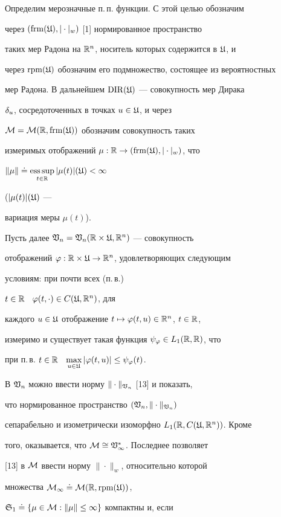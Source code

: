 Определим мерозначные п.\,п. функции. С этой целью обозначим


через $(\operatorname{frm}(\frak U),|\cdot|_{w})$ [1] нормированное пространство


таких мер Радона на $\Bbb R^{n}$, носитель которых содержится в $\frak U$, и


через $\operatorname{rpm}(\frak U)$ обозначим его подмножество, состоящее из вероятностных


мер Радона. В дальнейшем $\operatorname{DIR}(\frak U)$ --- совокупность мер Дирака


$\delta_{u}$, сосредоточенных в точках $u\in\frak U$, и через


$\cal M=\cal M(\Bbb R,\operatorname{frm}(\frak U))$ обозначим совокупность таких


измеримых отображений $\mu:\Bbb R\to (\operatorname{frm}(\frak U),|\cdot|_{w})$, что


$\|\mu\|\doteq\esssup\lt_{t\in\R}|\mu(t)|(\frak U)<\infty$


($|\mu(t)|(\frak U)$ ---


вариация меры $\mu(t)$).


Пусть далее $\frak V_{n}=\frak V_{n}(\Bbb R\times\frak U,\Bbb R^{n})$ --- совокупность


отображений $\varphi:\Bbb R\times\frak U\to\Bbb R^{n}$, удовлетворяющих следующим


условиям: при почти всех (п.\,в.)


$t\in \Bbb R$ \ $\varphi(t,\cdot)\in C(\frak U,\Bbb R^n)$, для


каждого $u\in\frak U$ отображение $t\mapsto \varphi(t,u)\in\Bbb R^n$, $t\in \Bbb R$,


измеримо и существует такая функция $\psi_{\varphi}\in L_{1}(\Bbb R,\Bbb R)$, что


при п.\,в. $t\in\Bbb R$ \ $\max\limits_{u\in\frak U}|\varphi(t,u)|\le\psi_{\varphi}(t)$.


В $\frak V_{n}$ можно ввести норму $\|\cdot\|_{\frak V_{n}}$ [13] и показать,


что нормированное пространство $(\frak V_{n},\|\cdot\|_{\frak V_{n}})$


сепарабельно и изометрически изоморфно $L_{1}(\Bbb R,C(\frak U,\Bbb R^{n}))$. Кроме


того, оказывается, что $\cal M\cong\frak V_{1}^{*}$. Последнее позволяет


[13] в $\cal M$ ввести норму $\|\cdot\|_{w}$, относительно которой


множества $\cal M_{1}\doteq\cal M(\Bbb R,\operatorname{rpm}(\frak U))$, 


$\frak S_{1}\doteq\{\mu\in\cal M:\|\mu\|\le 1\}$ компактны и, если


